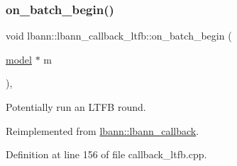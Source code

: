 \subsubsection{\texorpdfstring{on\+\_\+batch\+\_\+begin()}{on\_batch\_begin()}}
{\footnotesize\ttfamily void lbann\+::lbann\+\_\+callback\+\_\+ltfb\+::on\+\_\+batch\+\_\+begin (\begin{DoxyParamCaption}\item[{\hyperlink{classlbann_1_1model}{model} $\ast$}]{m }\end{DoxyParamCaption})\hspace{0.3cm}{\ttfamily [override]}, {\ttfamily [virtual]}}

Potentially run an L\+T\+FB round. 

Reimplemented from \hyperlink{classlbann_1_1lbann__callback_a9ecf4e44cd4021cdd687de14c850cc83}{lbann\+::lbann\+\_\+callback}.



Definition at line 156 of file callback\+\_\+ltfb.\+cpp.


